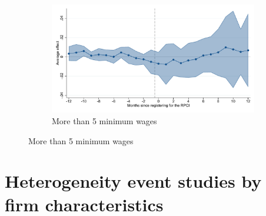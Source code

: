 \begin{figure}[H]
    \begin{subfigure}{0.32\textwidth}
    \caption{More than 5 minimum wages}
    \includegraphics[width=\textwidth]{04_Figures/muestra_10porciento/event_study_log_sal_cierre_sal_min_5_dcdh_connected.pdf}
    \end{subfigure}
    
\end{figure}

\clearpage
\section{ Heterogeneity event studies by firm characteristics}
\label{appendix_firm_char}

